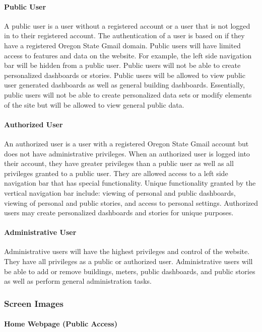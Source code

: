 \paragraph{Public User}
A public user is a user without a registered account or a user that is not logged in to their registered account. The authentication of a user is based on if 
they have a registered Oregon State Gmail domain. Public users will have limited access to features and data on the website. For example, the left side navigation
bar will be hidden from a public user. Public users will not be able to create personalized dashboards or stories. Public users will be allowed to view public 
user generated dashboards as well as general building dashboards. Essentially, public users will not be able to create personalized data sets or modify elements of the site but will be 
allowed to view general public data. 
\paragraph{Authorized User}
An authorized user is a user with a registered Oregon State Gmail account but does not have administrative privileges. When an authorized user is logged into their account, 
they have greater privileges than a public user as well as all privileges granted to a public user. They are allowed access to a left side navigation 
bar that has special functionality. Unique functionality granted by the vertical navigation bar include: viewing of personal and public dashboards, viewing of personal and public
stories, and access to personal settings. Authorized users may create personalized dashboards and stories for unique purposes.

\paragraph{Administrative User}
Administrative users will have the highest privileges and control of the website. They have all privileges as a public or authorized user. Administrative users
will be able to add or remove buildings, meters, public dashboards, and public stories as well as perform general administration tasks.


\subsubsection{Screen Images}

\paragraph{Home Webpage (Public Access)} 

